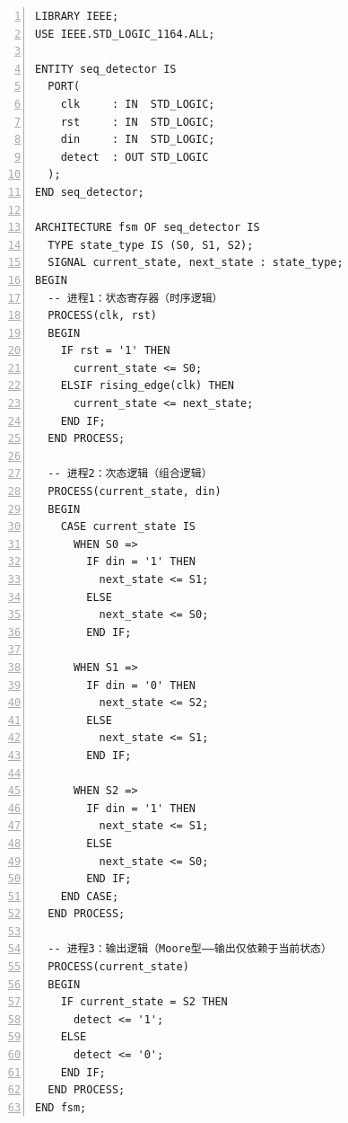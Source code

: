 \vspace{0.3cm}

\begin{lstlisting}[caption={``101''序列检测器——待分析VHDL程序}, language=VDL, numbers=left]
LIBRARY IEEE;
USE IEEE.STD_LOGIC_1164.ALL;

ENTITY seq_detector IS
  PORT(
    clk     : IN  STD_LOGIC;
    rst     : IN  STD_LOGIC;
    din     : IN  STD_LOGIC;
    detect  : OUT STD_LOGIC
  );
END seq_detector;

ARCHITECTURE fsm OF seq_detector IS
  TYPE state_type IS (S0, S1, S2);
  SIGNAL current_state, next_state : state_type;
BEGIN
  -- 进程1：状态寄存器（时序逻辑）
  PROCESS(clk, rst)
  BEGIN
    IF rst = '1' THEN
      current_state <= S0;
    ELSIF rising_edge(clk) THEN
      current_state <= next_state;
    END IF;
  END PROCESS;

  -- 进程2：次态逻辑（组合逻辑）
  PROCESS(current_state, din)
  BEGIN
    CASE current_state IS
      WHEN S0 =>
        IF din = '1' THEN
          next_state <= S1;
        ELSE
          next_state <= S0;
        END IF;

      WHEN S1 =>
        IF din = '0' THEN
          next_state <= S2;
        ELSE
          next_state <= S1;
        END IF;

      WHEN S2 =>
        IF din = '1' THEN
          next_state <= S1;
        ELSE
          next_state <= S0;
        END IF;
    END CASE;
  END PROCESS;

  -- 进程3：输出逻辑（Moore型——输出仅依赖于当前状态）
  PROCESS(current_state)
  BEGIN
    IF current_state = S2 THEN
      detect <= '1';
    ELSE
      detect <= '0';
    END IF;
  END PROCESS;
END fsm;
\end{lstlisting}

\vspace{0.3cm}

